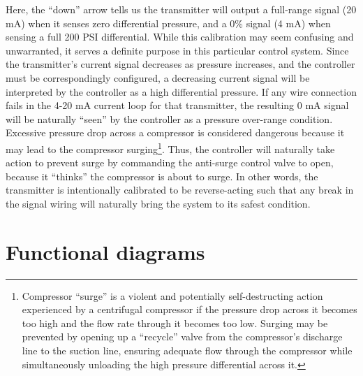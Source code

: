 Here, the ``down'' arrow tells us the transmitter will output a full-range signal (20 mA) when it senses zero differential pressure, and a 0\% signal (4 mA) when sensing a full 200 PSI differential.  While this calibration may seem confusing and unwarranted, it serves a definite purpose in this particular control system.  Since the transmitter's current signal decreases as pressure increases, and the controller must be correspondingly configured, a decreasing current signal will be interpreted by the controller as a high differential pressure.  If any wire connection fails in the 4-20 mA current loop for that transmitter, the resulting 0 mA signal will be naturally ``seen'' by the controller as a pressure over-range condition.  Excessive pressure drop across a compressor is considered dangerous because it may lead to the compressor surging\footnote{Compressor ``surge'' is a violent and potentially self-destructing action experienced by a centrifugal compressor if the pressure drop across it becomes too high and the flow rate through it becomes too low.  Surging may be prevented by opening up a ``recycle'' valve from the compressor's discharge line to the suction line, ensuring adequate flow through the compressor while simultaneously unloading the high pressure differential across it.}.  Thus, the controller will naturally take action to prevent surge by commanding the anti-surge control valve to open, because it ``thinks'' the compressor is about to surge.  In other words, the transmitter is intentionally calibrated to be reverse-acting such that any break in the signal wiring will naturally bring the system to its safest condition.








\filbreak
\section{Functional diagrams}


